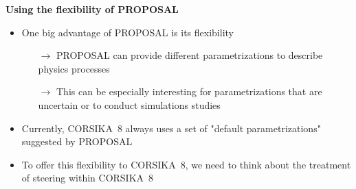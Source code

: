 \documentclass[aspectratio=1610, 9pt]{beamer}
\begin{document}
\begin{frame}

  \textbf{Using the flexibility of PROPOSAL}

    \begin{itemize}
      \item One big advantage of PROPOSAL is its flexibility
      \begin{itemize}
        \item[$\rightarrow$] PROPOSAL can provide different parametrizations to describe physics processes
        \item[$\rightarrow$] This can be especially interesting for parametrizations that are uncertain or to conduct simulations studies 
      \end{itemize}
      \item Currently, CORSIKA~8 always uses a set of "default parametrizations" suggested by PROPOSAL
      \item To offer this flexibility to CORSIKA~8, we need to think about the treatment of steering within CORSIKA~8
    \end{itemize}
\end{frame}
\end{document}
